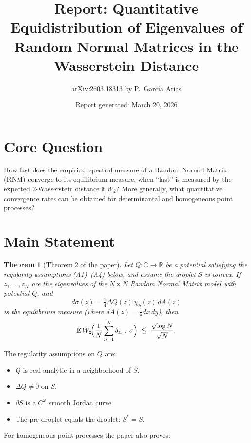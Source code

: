 \documentclass[11pt,a4paper]{article}
\title{Report: Quantitative Equidistribution of Eigenvalues of Random Normal Matrices in the Wasserstein Distance}
\author{arXiv:2603.18313 \quad by P.\ Garc\'ia Arias}
\date{Report generated: March 20, 2026}
\newtheorem{theorem}{Theorem}
\theoremstyle{definition}
\begin{document}
\maketitle

\section{Core Question}

How fast does the empirical spectral measure of a Random Normal Matrix (RNM) converge to its equilibrium measure, when ``fast'' is measured by the expected 2-Wasserstein distance $\mathbb{E}\,W_2$? More generally, what quantitative convergence rates can be obtained for determinantal and homogeneous point processes?

\section{Main Statement}

\begin{theorem}[Theorem 2 of the paper]
Let $Q:\mathbb{C}\to\mathbb{R}$ be a potential satisfying the regularity assumptions (A1)--(A4) below, and assume the droplet $S$ is convex. If $z_1,\dots,z_N$ are the eigenvalues of the $N\times N$ Random Normal Matrix model with potential $Q$, and
\[
d\sigma(z) = \tfrac{1}{4}\Delta Q(z)\,\chi_S(z)\,dA(z)
\]
is the equilibrium measure (where $dA(z)=\frac{1}{\pi}dx\,dy$), then
\[
\mathbb{E}\,W_2\!\Bigl(\frac{1}{N}\sum_{n=1}^N \delta_{z_n},\;\sigma\Bigr) \;\lesssim\; \frac{\sqrt{\log N}}{\sqrt{N}}.
\]
\end{theorem}

The regularity assumptions on $Q$ are:
\begin{itemize}[nosep]
  \item[(A1)] $Q$ is real-analytic in a neighborhood of $S$.
  \item[(A2)] $\Delta Q \neq 0$ on $S$.
  \item[(A3)] $\partial S$ is a $C^\omega$ smooth Jordan curve.
  \item[(A4)] The pre-droplet equals the droplet: $S^* = S$.
\end{itemize}

For homogeneous point processes the paper also proves:
\end{document}
